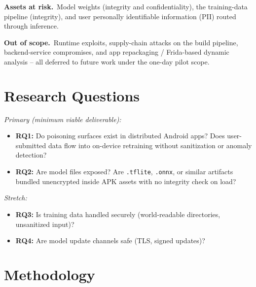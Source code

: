 \documentclass[conference]{IEEEtran}
\begin{document}
\noindent \textbf{Assets at risk.}~Model weights (integrity and
confidentiality), the training-data pipeline (integrity), and user
personally identifiable information (PII) routed through inference.

\noindent \textbf{Out of scope.}~Runtime exploits, supply-chain attacks
on the build pipeline, backend-service compromises, and app repackaging
/ Frida-based dynamic analysis -- all deferred to future work under
the one-day pilot scope.

\section{Research Questions}
\label{sec:rq}

\noindent \emph{Primary (minimum viable deliverable):}
\begin{itemize}
\item \textbf{RQ1:} Do poisoning surfaces exist in distributed Android
  apps? Does user-submitted data flow into on-device retraining
  without sanitization or anomaly detection?
\item \textbf{RQ2:} Are model files exposed? Are \texttt{.tflite},
  \texttt{.onnx}, or similar artifacts bundled unencrypted inside APK
  assets with no integrity check on load?
\end{itemize}

\noindent \emph{Stretch:}
\begin{itemize}
\item \textbf{RQ3:} Is training data handled securely (world-readable
  directories, unsanitized input)?
\item \textbf{RQ4:} Are model update channels safe (TLS, signed
  updates)?
\end{itemize}

\section{Methodology}
\label{sec:method}
\end{document}
